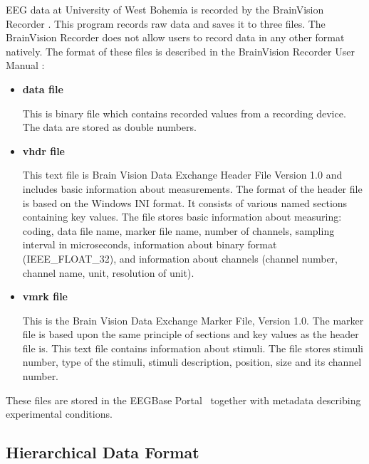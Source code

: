 \documentclass[conference]{IEEEtran}
\begin{document}
EEG data at University of West Bohemia is recorded by the BrainVision Recorder \cite{brainvision}. This program records raw data and saves it to three files. The BrainVision Recorder does not allow users to record data in any other format natively. The format of these files is described in the BrainVision Recorder User Manual \cite{brainUserManual}:
\begin{itemize}
	\item \textbf{data file}
	\label{eeg}
	
	This is binary file which contains recorded values from a recording device. The data are stored as double numbers.
	
	\item \textbf{vhdr file}
	\label{vhdr}
	
	This text file is Brain Vision Data Exchange Header File Version 1.0 and includes basic information about measurements. The format of the header file is based on the Windows INI format. It consists of various named sections containing key values. The file stores basic information about measuring: coding, data file name, marker file name, number of channels, sampling interval in microseconds, information about binary format (IEEE\_FLOAT\_32), and information about channels (channel number, channel name, unit, resolution of unit).
	
	\item \textbf{vmrk file}
	\label{vmrk}
	
	This is the Brain Vision Data Exchange Marker File, Version 1.0. The marker file is based upon the same principle of sections and key values as the header file is. This text file contains information about stimuli. The file stores stimuli number, type of the stimuli, stimuli description, position, size and its channel number.
	
\end{itemize}

These files are stored in the EEGBase Portal~\cite{eegportal} together with metadata describing experimental conditions.

\subsection{Hierarchical Data Format}
\end{document}

